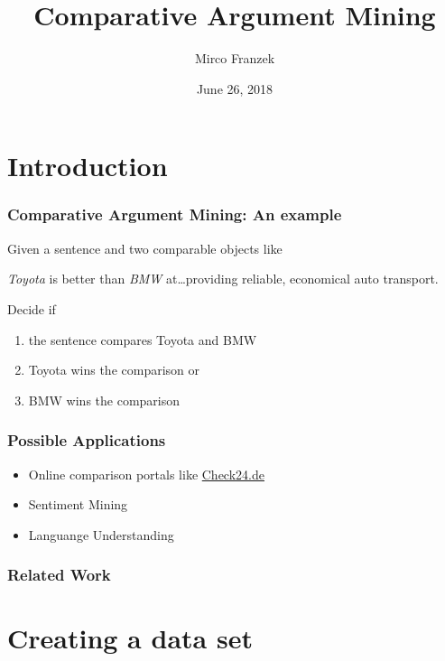 \documentclass[11pt,aspectratio=169]{beamer}
\title{Comparative Argument Mining}
\author{Mirco Franzek}
\date{June 26, 2018}
\begin{document}
    \maketitle

    \section{Introduction}
    \frame{\sectionpage}

    \begin{frame}
        \frametitle{Comparative Argument Mining: An example}
        Given a sentence and two comparable objects like

        \begin{center}
            \LARGE \emph{Toyota} is better than \emph{BMW} at\ldots providing reliable, economical auto transport.
        \end{center}

        Decide if

        \begin{enumerate}
            \item the sentence compares Toyota and BMW
            \item Toyota wins the comparison or
            \item BMW wins the comparison
        \end{enumerate}

    \end{frame}

    \begin{frame}
        \frametitle{Possible Applications}

        \begin{itemize}
            \item Online comparison portals like \url{Check24.de}
            \item Sentiment Mining
            \item Languange Understanding
        \end{itemize}

    \end{frame}


    \begin{frame}
        \frametitle{Related Work}

    \end{frame}


    \section{Creating a data set}
    \frame{\sectionpage}
\end{document}
